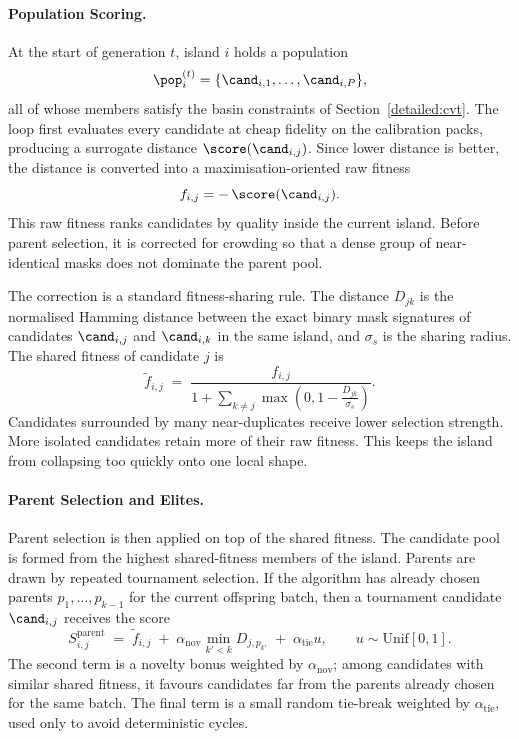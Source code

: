 \paragraph{Population Scoring.}
At the start of generation $t$, island $i$ holds a population
\[
\pop_i^{(t)} = \{\cand_{i,1}, \ldots, \cand_{i,P}\},
\]
all of whose members satisfy the basin constraints of Section~\ref{detailed:cvt}. The loop first evaluates every candidate at cheap fidelity on the calibration packs, producing a surrogate distance $\score(\cand_{i,j})$. Since lower distance is better, the distance is converted into a maximisation-oriented raw fitness
\[
f_{i,j} = -\,\score(\cand_{i,j}).
\]
This raw fitness ranks candidates by quality inside the current island. Before parent selection, it is corrected for crowding so that a dense group of near-identical masks does not dominate the parent pool.

The correction is a standard fitness-sharing rule. The distance $D_{jk}$ is the normalised Hamming distance between the exact binary mask signatures of candidates $\cand_{i,j}$ and $\cand_{i,k}$ in the same island, and $\sigma_s$ is the sharing radius. The shared fitness of candidate $j$ is
\[
\tilde f_{i,j}
\;=\;
\frac{f_{i,j}}{
1 + \sum_{k \ne j} \max\!\left(0, 1 - \frac{D_{jk}}{\sigma_s}\right)
}.
\]
Candidates surrounded by many near-duplicates receive lower selection strength. More isolated candidates retain more of their raw fitness. This keeps the island from collapsing too quickly onto one local shape.

\paragraph{Parent Selection and Elites.}
Parent selection is then applied on top of the shared fitness. The candidate pool is formed from the highest shared-fitness members of the island. Parents are drawn by repeated tournament selection. If the algorithm has already chosen parents $p_1,\ldots,p_{k-1}$ for the current offspring batch, then a tournament candidate $\cand_{i,j}$ receives the score
\[
S_{i,j}^{\mathrm{parent}}
\;=\;
\tilde f_{i,j}
\;+\;
\alpha_{\mathrm{nov}}
\min_{k' < k} D_{j,p_{k'}}
\;+\;
\alpha_{\mathrm{tie}}u,
\qquad
u \sim \mathrm{Unif}[0,1].
\]
The second term is a novelty bonus weighted by $\alpha_{\mathrm{nov}}$; among candidates with similar shared fitness, it favours candidates far from the parents already chosen for the same batch. The final term is a small random tie-break weighted by $\alpha_{\mathrm{tie}}$, used only to avoid deterministic cycles.

